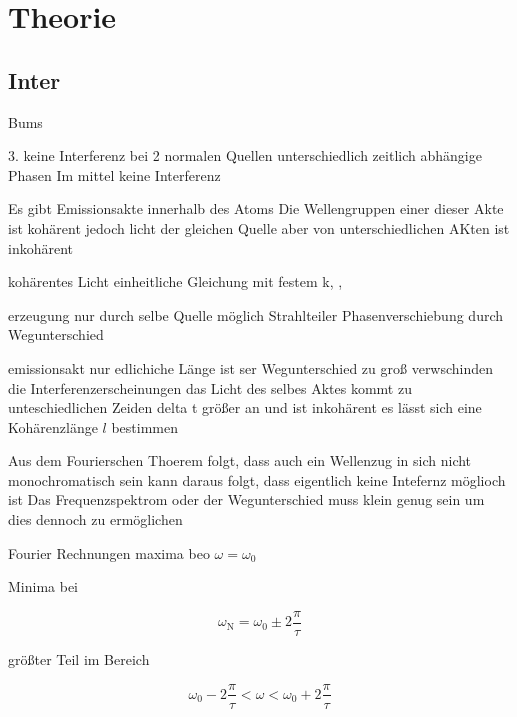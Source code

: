 \section{Theorie}

    \subsection{Inter}

        \noindent Bums


    3. 
        keine Interferenz bei 2 normalen Quellen 
            unterschiedlich zeitlich abhängige Phasen
                Im mittel keine Interferenz

            Es gibt Emissionsakte innerhalb des Atoms
                Die Wellengruppen einer dieser Akte ist kohärent
                jedoch licht der gleichen Quelle aber von unterschiedlichen AKten ist inkohärent

            kohärentes Licht 
                einheitliche Gleichung mit festem k, \omega , \delta

            erzeugung nur durch selbe Quelle möglich 
                Strahlteiler 
                    Phasenverschiebung durch Wegunterschied 

            emissionsakt nur edlichiche Länge \tau 
                ist ser Wegunterschied zu groß verwschinden die Interferenzerscheinungen
                    das Licht des selbes Aktes kommt zu unteschiedlichen Zeiden delta t größer \tau an und ist inkohärent
                es lässt sich eine Kohärenzlänge $l$ bestimmen 

            Aus dem Fourierschen Thoerem folgt, dass auch ein Wellenzug in sich nicht monochromatisch sein kann 
                daraus folgt, dass eigentlich keine Intefernz möglioch ist 
                    Das Frequenzspektrom oder der Wegunterschied muss klein genug sein um dies dennoch zu ermöglichen 

            Fourier Rechnungen 
            maxima beo $\omega = \omega_0$

            Minima bei 

            \begin{equation}
                \omega_{\text{N}} = \omega_0 \pm 2\frac{\pi}{\tau}              
            \end{equation}

            größter Teil im Bereich 

            \begin{equation}
                \omega_0 - 2\frac{\pi}{\tau} < \omega < \omega_0 + 2\frac{\pi}{\tau}
            \end{equation}

